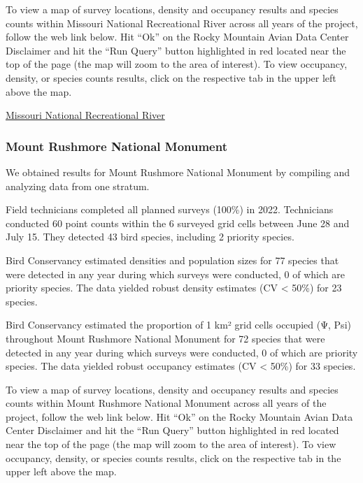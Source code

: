 \documentclass[
  letterpaper,
  DIV=11,
  numbers=noendperiod,
  oneside]{scrreprt}
\begin{document}
To view a map of survey locations, density and occupancy results and
species counts within Missouri National Recreational River across all
years of the project, follow the web link below. Hit ``Ok'' on the Rocky
Mountain Avian Data Center Disclaimer and hit the ``Run Query'' button
highlighted in red located near the top of the page (the map will zoom
to the area of interest). To view occupancy, density, or species counts
results, click on the respective tab in the upper left above the map.

\href{http://www.rmbo.org/new_site/adc/QueryWindow.aspx\#N4IgzgrgDgpgTmALnAhoiBbEAuABCAWQEswwB7COI3AOTSLIDsUAbXAJRgGM4Z6nWHIgDd4IAL5A}{Missouri
National Recreational River}

\hypertarget{mount-rushmore-national-monument}{%
\subsubsection{Mount Rushmore National
Monument}\label{mount-rushmore-national-monument}}

We obtained results for Mount Rushmore National Monument by compiling
and analyzing data from one stratum.

Field technicians completed all planned surveys (100\%) in 2022.
Technicians conducted 60 point counts within the 6 surveyed grid cells
between June 28 and July 15. They detected 43 bird species, including 2
priority species.

Bird Conservancy estimated densities and population sizes for 77 species
that were detected in any year during which surveys were conducted, 0 of
which are priority species. The data yielded robust density estimates
(CV \textless{} 50\%) for 23 species.

Bird Conservancy estimated the proportion of 1 km² grid cells occupied
(Ψ, Psi) throughout Mount Rushmore National Monument for 72 species that
were detected in any year during which surveys were conducted, 0 of
which are priority species. The data yielded robust occupancy estimates
(CV \textless{} 50\%) for 33 species.

To view a map of survey locations, density and occupancy results and
species counts within Mount Rushmore National Monument across all years
of the project, follow the web link below. Hit ``Ok'' on the Rocky
Mountain Avian Data Center Disclaimer and hit the ``Run Query'' button
highlighted in red located near the top of the page (the map will zoom
to the area of interest). To view occupancy, density, or species counts
results, click on the respective tab in the upper left above the map.
\end{document}
